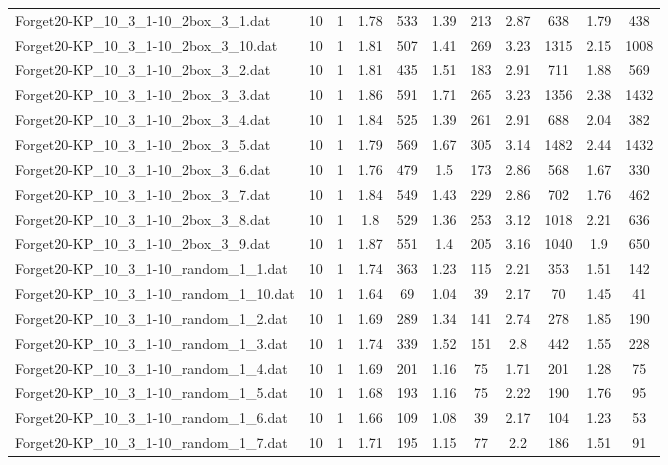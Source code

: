 \begin{table}[!ht]
\begin{tabular}{lcccccccccc}
Forget20-KP\_10\_3\_1-10\_2box\_3\_1.dat & 10 & 1 & 1.78 & 533 & 1.39 & 213 & 2.87 & 638 & 1.79 & 438 \\
Forget20-KP\_10\_3\_1-10\_2box\_3\_10.dat & 10 & 1 & 1.81 & 507 & 1.41 & 269 & 3.23 & 1315 & 2.15 & 1008 \\
Forget20-KP\_10\_3\_1-10\_2box\_3\_2.dat & 10 & 1 & 1.81 & 435 & 1.51 & 183 & 2.91 & 711 & 1.88 & 569 \\
Forget20-KP\_10\_3\_1-10\_2box\_3\_3.dat & 10 & 1 & 1.86 & 591 & 1.71 & 265 & 3.23 & 1356 & 2.38 & 1432 \\
Forget20-KP\_10\_3\_1-10\_2box\_3\_4.dat & 10 & 1 & 1.84 & 525 & 1.39 & 261 & 2.91 & 688 & 2.04 & 382 \\
Forget20-KP\_10\_3\_1-10\_2box\_3\_5.dat & 10 & 1 & 1.79 & 569 & 1.67 & 305 & 3.14 & 1482 & 2.44 & 1432 \\
Forget20-KP\_10\_3\_1-10\_2box\_3\_6.dat & 10 & 1 & 1.76 & 479 & 1.5 & 173 & 2.86 & 568 & 1.67 & 330 \\
Forget20-KP\_10\_3\_1-10\_2box\_3\_7.dat & 10 & 1 & 1.84 & 549 & 1.43 & 229 & 2.86 & 702 & 1.76 & 462 \\
Forget20-KP\_10\_3\_1-10\_2box\_3\_8.dat & 10 & 1 & 1.8 & 529 & 1.36 & 253 & 3.12 & 1018 & 2.21 & 636 \\
Forget20-KP\_10\_3\_1-10\_2box\_3\_9.dat & 10 & 1 & 1.87 & 551 & 1.4 & 205 & 3.16 & 1040 & 1.9 & 650 \\
Forget20-KP\_10\_3\_1-10\_random\_1\_1.dat & 10 & 1 & 1.74 & 363 & 1.23 & 115 & 2.21 & 353 & 1.51 & 142 \\
Forget20-KP\_10\_3\_1-10\_random\_1\_10.dat & 10 & 1 & 1.64 & 69 & 1.04 & 39 & 2.17 & 70 & 1.45 & 41 \\
Forget20-KP\_10\_3\_1-10\_random\_1\_2.dat & 10 & 1 & 1.69 & 289 & 1.34 & 141 & 2.74 & 278 & 1.85 & 190 \\
Forget20-KP\_10\_3\_1-10\_random\_1\_3.dat & 10 & 1 & 1.74 & 339 & 1.52 & 151 & 2.8 & 442 & 1.55 & 228 \\
Forget20-KP\_10\_3\_1-10\_random\_1\_4.dat & 10 & 1 & 1.69 & 201 & 1.16 & 75 & 1.71 & 201 & 1.28 & 75 \\
Forget20-KP\_10\_3\_1-10\_random\_1\_5.dat & 10 & 1 & 1.68 & 193 & 1.16 & 75 & 2.22 & 190 & 1.76 & 95 \\
Forget20-KP\_10\_3\_1-10\_random\_1\_6.dat & 10 & 1 & 1.66 & 109 & 1.08 & 39 & 2.17 & 104 & 1.23 & 53 \\
Forget20-KP\_10\_3\_1-10\_random\_1\_7.dat & 10 & 1 & 1.71 & 195 & 1.15 & 77 & 2.2 & 186 & 1.51 & 91 \\

\end{tabular}
\end{table}
